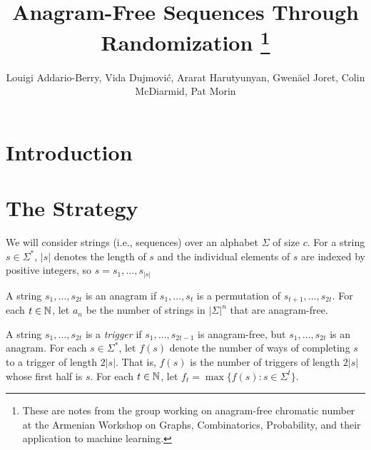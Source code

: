 \documentclass{patmorin}
\title{Anagram-Free Sequences Through Randomization%
   \thanks{These are notes from the group working on anagram-free chromatic number at the Armenian Workshop on Graphs, Combinatorics, Probability,
   and their application to machine learning.}}
\author{Louigi Addario-Berry, Vida Dujmović, Ararat Harutyunyan, Gwenäel Joret, Colin McDiarmid, Pat Morin}
\begin{document}
\maketitle
%
\begin{abstract}
\end{abstract}
%
%


\section{Introduction}









\section{The Strategy}

We will consider strings (i.e., sequences) over an alphabet $\Sigma$ of size $c$.  For a string $s\in\Sigma^*$, $|s|$ denotes the length of $s$ and the individual elements of $s$ are indexed by positive integers, so $s=s_1,\ldots,s_{|s|}$

A string $s_1,\ldots,s_{2t}$ is an anagram if $s_1,\ldots,s_t$ is a permutation of $s_{t+1},\ldots,s_{2t}$.  For each $t\in\mathbb{N}$, let $a_n$ be the number of strings in $|\Sigma|^n$ that are anagram-free.  

A string $s_1,\ldots,s_{2t}$ is a \emph{trigger} if $s_1,\ldots,s_{2t-1}$ is anagram-free, but $s_1,\ldots,s_{2t}$ is an anagram.  For each $s\in\Sigma^*$, let $f(s)$ denote the number of ways of completing $s$ to a trigger of length $2|s|$.  That is, $f(s)$ is the number of triggers of length $2|s|$ whose first half is $s$.  For each $t\in\mathbb{N}$, let $f_t = \max\{f(s):s\in\Sigma^t\}$.
\end{document}
